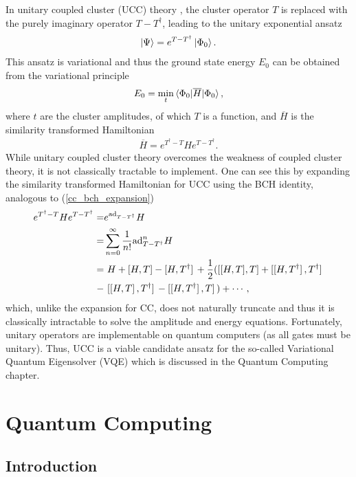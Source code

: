\documentclass[Dual]{msu-thesis}
\begin{document}
In unitary coupled cluster (UCC) theory \cite{ref:ucc}, the cluster operator $T$ is replaced with the purely imaginary operator $T-T^\dagger$, leading to the unitary exponential ansatz
\begin{align}
\ket{\Psi}=e^{T-T^\dagger}\ket{\Phi_0}
.\end{align}
This ansatz is variational and thus the ground state energy $E_0$ can be obtained from the variational principle
\begin{align}
E_0=\underset{t}{\min}\mel{\Phi_0}{\overline{H}}{\Phi_0}
,\end{align}
where $t$ are the cluster amplitudes, of which $T$ is a function, and $\overline{H}$ is the similarity transformed Hamiltonian
\begin{align}
\overline{H}= e^{T^\dagger-T}He^{T-T^{\dagger}}
.\end{align}
While unitary coupled cluster theory overcomes the weakness of coupled cluster theory, it is not classically tractable to implement. One can see this by expanding the similarity transformed Hamiltonian for UCC using the BCH identity, analogous to (\ref{cc_bch_expansion})
\begin{align}
e^{T^\dagger-T}He^{T-T^\dagger}
=&
e^{\text{ad}_{T-T^\dagger}}H
\\
=&
\sum_{n=0}^\infty\frac{1}{n!}\text{ad}^n_{T-T^\dagger}H
\nonumber
\\
=&
\label{ucc_bch_expansion}
\ H+\comm{H}{T}-\comm*{H}{T^\dagger}+\frac{1}{2}(\comm{\comm{H}{T}}{T}+\comm*{\comm*{H}{T^\dagger}}{T^\dagger}
\nonumber
\\
-& \ \comm*{\comm*{H}{T}}{T^\dagger} - \comm*{\comm*{H}{T^\dagger}}{T})+\cdots
,\end{align}
which, unlike the expansion for CC, does not naturally truncate and thus it is classically intractable to solve the amplitude and energy equations. Fortunately, unitary operators are implementable on quantum computers (as all gates must be unitary). Thus, UCC is a viable candidate ansatz for the so-called Variational Quantum Eigensolver (VQE) which is discussed in the Quantum Computing chapter.


\chapter{Quantum Computing}

\section{Introduction}
\end{document}
